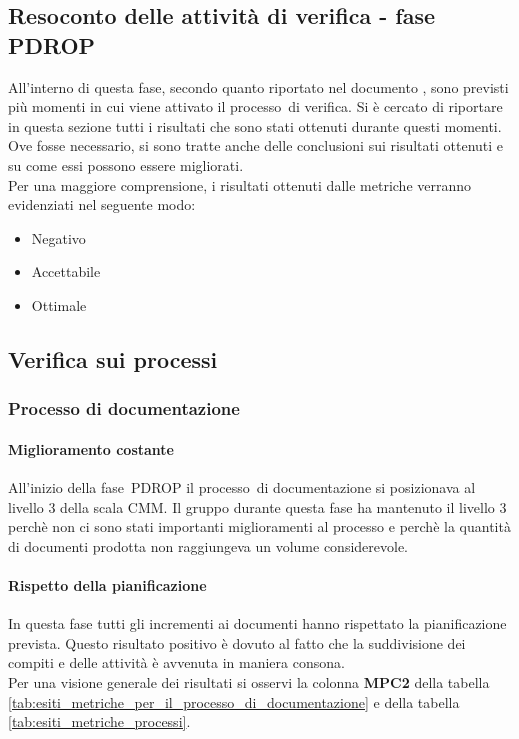 \documentclass[../PianoDiQualifica.tex]{subfiles}
\begin{document}
\begin{appendices}
\section{Resoconto delle attività di verifica - fase PDROP}
All'interno di questa fase\g, secondo quanto riportato nel documento \pianodiprogetto, sono previsti più momenti in cui viene attivato il processo\g\ di verifica. Si è cercato di riportare in questa sezione tutti i risultati che sono stati ottenuti durante questi momenti. Ove fosse necessario, si sono tratte anche delle conclusioni sui risultati ottenuti e su come essi possono essere migliorati.\\
Per una maggiore comprensione, i risultati ottenuti dalle metriche verranno evidenziati nel seguente modo: 
\begin{itemize} 
	\item {\color{red}Negativo} 
	\item Accettabile 
	\item {\color{dkgreen}Ottimale}
\end{itemize}  
	
	\subsection{Verifica sui processi}
		\subsubsection{Processo di documentazione}
			\paragraph{Miglioramento costante}
			All'inizio della fase\g\ PDROP il processo\g\ di documentazione si posizionava al livello 3 della scala CMM\g.
			Il gruppo durante questa fase ha mantenuto il livello 3 perchè non ci sono stati importanti miglioramenti al processo e perchè la quantità di documenti prodotta non raggiungeva un volume considerevole.
			
			\paragraph{Rispetto della pianificazione}
			In questa fase tutti gli incrementi ai documenti hanno rispettato la pianificazione prevista. Questo risultato positivo è dovuto al fatto che la suddivisione dei compiti e delle attività è avvenuta in maniera consona.\\ 
			Per una visione generale dei risultati si osservi la colonna \textbf{MPC2}  della tabella \ref{tab:esiti_metriche_per_il_processo_di_documentazione} e della tabella \ref{tab:esiti_metriche_processi}.
			

\end{appendices}
\end{document}

